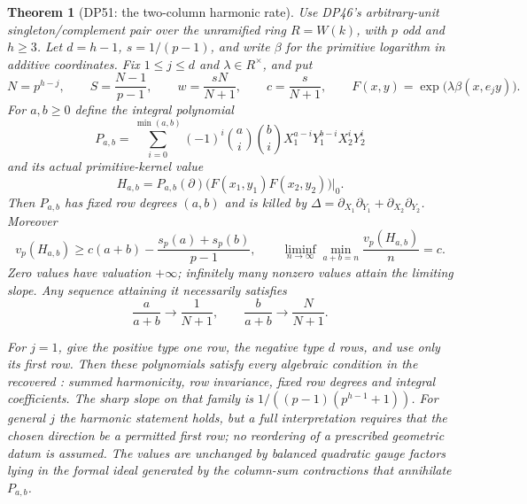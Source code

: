 \documentclass[11pt,a4paper]{article}
\newtheorem{theorem}{Theorem}[section]
\theoremstyle{definition}\newtheorem{remark}[theorem]{Remark}
\newcommand{\vp}{v_p}\newcommand{\dR}{\mathrm{dR}}\newcommand{\crys}{\mathrm{crys}}
\begin{document}
\begin{theorem}[DP51: the two-column harmonic rate]\label{DP51}
Use DP46's arbitrary-unit singleton/complement pair over the unramified ring
$R=W(k)$, with $p$ odd and $h\ge3$.
Let $d=h-1$, $s=1/(p-1)$, and write $\beta$ for the primitive logarithm in additive coordinates.
Fix $1\le j\le d$ and $\lambda\in R^\times$, and put
\[
 N=p^{h-j},\qquad S=\frac{N-1}{p-1},\qquad
 w=\frac{sN}{N+1},\qquad c=\frac{s}{N+1},
 \qquad F(x,y)=\exp\bigl(\lambda\beta(x,e_jy)\bigr).
\]
For $a,b\ge0$ define the integral polynomial
\[
 P_{a,b}=\sum_{i=0}^{\min(a,b)}(-1)^i
 \binom ai\binom bi
 X_1^{a-i}Y_1^{b-i}X_2^iY_2^i
\]
and its actual primitive-kernel value
\[
 H_{a,b}=P_{a,b}(\partial)
       \bigl(F(x_1,y_1)F(x_2,y_2)\bigr)\big|_0.
\]
Then $P_{a,b}$ has fixed row degrees $(a,b)$ and is killed by
$\Delta=\partial_{X_1}\partial_{Y_1}+\partial_{X_2}\partial_{Y_2}$.
Moreover
\begin{equation}\label{eq:harmonicsharp}
 \vp(H_{a,b})\ge c(a+b)-\frac{s_p(a)+s_p(b)}{p-1},
 \qquad
 \liminf_{n\to\infty}\min_{a+b=n}\frac{\vp(H_{a,b})}{n}=c.
\end{equation}
Zero values have valuation $+\infty$; infinitely many nonzero values attain the limiting slope.
Any sequence attaining it necessarily satisfies
\[
 \frac{a}{a+b}\longrightarrow\frac1{N+1},\qquad
 \frac{b}{a+b}\longrightarrow\frac{N}{N+1}.
\]

For $j=1$, give the positive type one row, the negative type $d$ rows, and use only its first row.
Then these polynomials satisfy every algebraic condition in the recovered : summed harmonicity, row invariance, fixed row degrees and integral coefficients.
The sharp slope on that family is $1/((p-1)(p^{h-1}+1))$.
For general $j$ the harmonic statement holds, but a full  interpretation requires that the chosen direction be a permitted first row; no reordering of a prescribed geometric datum is assumed.
The values are unchanged by balanced quadratic gauge factors lying in the formal ideal generated by the column-sum contractions that annihilate $P_{a,b}$.
\end{theorem}
\end{document}
